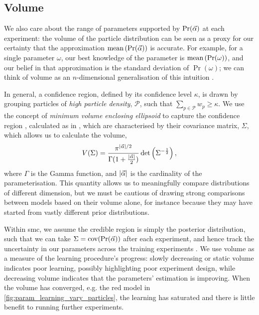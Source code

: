 \subsection{Volume}\label{sec:volume}
We also care about the range of parameters supported by $\Pr(\vec{\alpha})$ at each experiment: 
    the \gls{volume} of the \gls{particle} distribution can be seen as a proxy for our certainty
    that the approximation $\textrm{mean}\left(\Pr(\vec{\alpha})\right) $ is accurate. 
For example, for a single parameter $\omega$, our best knowledge of the parameter is $\textrm{mean}\left( \Pr(\omega) \right)$, 
    and our belief in that approximation is the standard deviation of $\Pr(\omega)$; 
    we can think of \gls{volume} as an $n$-dimensional generalisation of this intuition \cite{qinfer-1_0, ferrie2014high}. 
\par 
In general, a confidence region, defined by its confidence level $\kappa$, is drawn by grouping \glspl{particle} 
    of \emph{high \gls{particle} density}, $\mathcal{P}$, such that $\sum\limits_{p \in \mathcal{P}} w_{p} \geq \kappa$.
We use the concept of \emph{minimum volume enclosing ellipsoid}
    to capture the confidence region \cite{ferrie2014high}, calculated as in \cite{todd2007khachiyan}, 
    which are characterised by their covariance matrix, $\Sigma$, which allows us to calculate the \gls{volume}, 
    \begin{equation}
        \label{eqn:volume}
        V(\Sigma) = \frac{ \pi^{| \vec{\alpha} | / 2}}{ \Gamma(1 + \frac{| \vec{\alpha} |}{2})} \det\left(\Sigma^{-\frac{1}{2}}\right),
    \end{equation}
    where $\Gamma$ is the Gamma function, and $|\vec{\alpha}|$ is the cardinality of the parameterisation. 
This quantity allows us to meaningfully compare distributions of different dimension, 
    but we must be cautious of drawing strong comparisons between models based on 
    their \gls{volume} alone, for instance because they may have started from vastly different prior distributions. 
\par 

Within \gls{smc}, we assume the credible region is simply the posterior distribution, 
    such that we can take $\Sigma = \textrm{cov}(\Pr(\vec{\alpha}))$ after each experiment, 
    and hence track the uncertainty in our parameters across the training \glspl{experiment} \cite{Granade:2012kj}.
We use \gls{volume} as a measure of the learning procedure's progress: 
    slowly decreasing or static \gls{volume} indicates poor learning, possibly highlighting poor \gls{experiment} design, 
    while decreasing \gls{volume} indicates that the parameters' estimation is improving.
When the \gls{volume} has converged, e.g. the red model in \cref{fig:param_learning_vary_particles},
    the learning has saturated and there is little benefit to running further \glspl{experiment}. 

